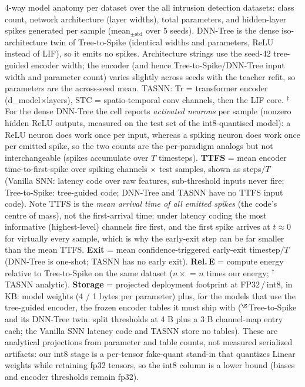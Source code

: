 \begin{table}[!ht]
\centering
\renewcommand{\arraystretch}{1.05}
\caption{4-way model anatomy per dataset over the all intrusion detection datasets: class count, network architecture (layer widths), total parameters, and hidden-layer spikes generated per sample (mean$_{\pm\text{std}}$ over 5 seeds). DNN-Tree is the dense iso-architecture twin of Tree-to-Spike (identical widths and parameters, ReLU instead of LIF), so it emits no spikes. Architecture strings use the seed-42 tree-guided encoder width; the encoder (and hence Tree-to-Spike/DNN-Tree input width and parameter count) varies slightly across seeds with the teacher refit, so parameters are the across-seed mean. TASNN: Tr = transformer encoder (d\_model$\times$layers), STC = spatio-temporal conv channels, then the LIF core. $^\ddagger$For the dense DNN-Tree the cell reports \emph{activated neurons} per sample (nonzero hidden ReLU outputs, measured on the test set of the int8-quantised model): a ReLU neuron does work once per input, whereas a spiking neuron does work once per emitted spike, so the two counts are the per-paradigm analogs but not interchangeable (spikes accumulate over $T$ timesteps). \textbf{TTFS} = mean encoder time-to-first-spike over spiking channels $\times$ test samples, shown as steps$/T$ (Vanilla SNN: latency code over raw features, sub-threshold inputs never fire; Tree-to-Spike: tree-guided code; DNN-Tree and TASNN have no TTFS input code). Note TTFS is the \emph{mean arrival time of all emitted spikes} (the code's centre of mass), not the first-arrival time: under latency coding the most informative (highest-level) channels fire first, and the first spike arrives at $t \approx 0$ for virtually every sample, which is why the early-exit step can be far smaller than the mean TTFS. \textbf{Exit} = mean confidence-triggered early-exit timestep$/T$ (DNN-Tree is one-shot; TASNN has no early exit). \textbf{Rel.\,E} = compute energy relative to Tree-to-Spike on the same dataset ($n\times$ = $n$ times our energy; $^\dagger$TASNN analytic). \textbf{Storage} = projected deployment footprint at FP32\,/\,int8, in KB: model weights (4 / 1 bytes per parameter) plus, for the models that use the tree-guided encoder, the frozen encoder tables it must ship with ($^{\S}$Tree-to-Spike and its DNN-Tree twin: split thresholds at 4 B plus a 3 B channel-map entry each; the Vanilla SNN latency code and TASNN store no tables). These are analytical projections from parameter and table counts, not measured serialized artifacts: our int8 stage is a per-tensor fake-quant stand-in that quantizes Linear weights while retaining fp32 tensors, so the int8 column is a lower bound (biases and encoder thresholds remain fp32).}

\end{table}
